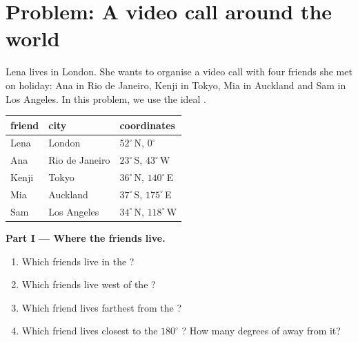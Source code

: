 \section{Problem: A video call around the world}

\begin{problem}
\label{pb:g6:latitude-longitude:1}
Lena lives in London. She wants to organise a video call with four friends
she met on holiday: Ana in Rio de Janeiro, Kenji in Tokyo, Mia in Auckland
and Sam in Los Angeles. In this problem, we use the ideal .

\begin{center}
\small
\begin{tabular}{lll}
\hline
friend & city & coordinates\\
\hline
Lena & London & $52^\circ$\,N, $0^\circ$\\
Ana & Rio de Janeiro & $23^\circ$\,S, $43^\circ$\,W\\
Kenji & Tokyo & $36^\circ$\,N, $140^\circ$\,E\\
Mia & Auckland & $37^\circ$\,S, $175^\circ$\,E\\
Sam & Los Angeles & $34^\circ$\,N, $118^\circ$\,W\\
\hline
\end{tabular}
\end{center}

\medskip
\noindent\textbf{Part I --- Where the friends live.}
\begin{enumerate}
  \item Which friends live in the ?
  \item Which friends live west of the ?
  \item Which friend lives farthest from the ?
  \item Which friend lives closest to the $180^\circ$ ? How many
        degrees of  away from it?
\end{enumerate}


\end{problem}
